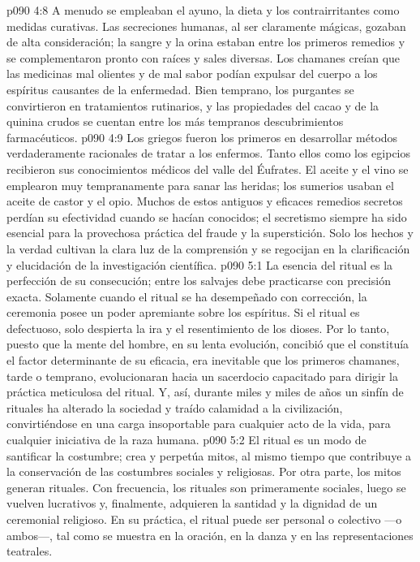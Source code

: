 \vs p090 4:8 A menudo se empleaban el ayuno, la dieta y los contrairritantes como medidas curativas. Las secreciones humanas, al ser claramente mágicas, gozaban de alta consideración; la sangre y la orina estaban entre los primeros remedios y se complementaron pronto con raíces y sales diversas. Los chamanes creían que las medicinas mal olientes y de mal sabor podían expulsar del cuerpo a los espíritus causantes de la enfermedad. Bien temprano, los purgantes se convirtieron en tratamientos rutinarios, y las propiedades del cacao y de la quinina crudos se cuentan entre los más tempranos descubrimientos farmacéuticos.
\vs p090 4:9 Los griegos fueron los primeros en desarrollar métodos verdaderamente racionales de tratar a los enfermos. Tanto ellos como los egipcios recibieron sus conocimientos médicos del valle del Éufrates. El aceite y el vino se emplearon muy tempranamente para sanar las heridas; los sumerios usaban el aceite de castor y el opio. Muchos de estos antiguos y eficaces remedios secretos perdían su efectividad cuando se hacían conocidos; el secretismo siempre ha sido esencial para la provechosa práctica del fraude y la superstición. Solo los hechos y la verdad cultivan la clara luz de la comprensión y se regocijan en la clarificación y elucidación de la investigación científica.
\vs p090 5:1 La esencia del ritual es la perfección de su consecución; entre los salvajes debe practicarse con precisión exacta. Solamente cuando el ritual se ha desempeñado con corrección, la ceremonia posee un poder apremiante sobre los espíritus. Si el ritual es defectuoso, solo despierta la ira y el resentimiento de los dioses. Por lo tanto, puesto que la mente del hombre, en su lenta evolución, concibió que el  constituía el factor determinante de su eficacia, era inevitable que los primeros chamanes, tarde o temprano, evolucionaran hacia un sacerdocio capacitado para dirigir la práctica meticulosa del ritual. Y, así, durante miles y miles de años un sinfín de rituales ha alterado la sociedad y traído calamidad a la civilización, convirtiéndose en una carga insoportable para cualquier acto de la vida, para cualquier iniciativa de la raza humana.
\vs p090 5:2 El ritual es un modo de santificar la costumbre; crea y perpetúa mitos, al mismo tiempo que contribuye a la conservación de las costumbres sociales y religiosas. Por otra parte, los mitos generan rituales. Con frecuencia, los rituales son primeramente sociales, luego se vuelven lucrativos y, finalmente, adquieren la santidad y la dignidad de un ceremonial religioso. En su práctica, el ritual puede ser personal o colectivo ---o ambos---, tal como se muestra en la oración, en la danza y en las representaciones teatrales.
